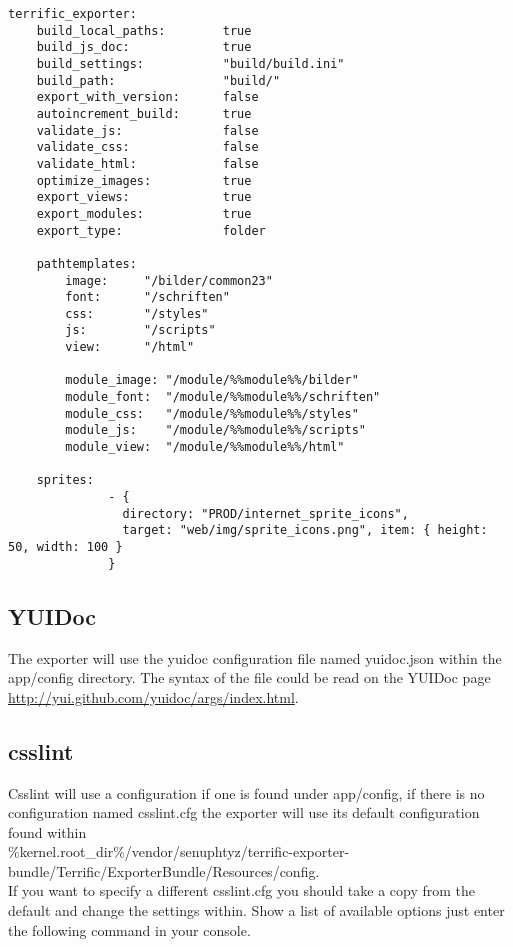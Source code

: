 \begin{verbatim}
terrific_exporter:
	build_local_paths:        true
	build_js_doc:             true
	build_settings:           "build/build.ini"
	build_path:               "build/"
	export_with_version:      false
	autoincrement_build:      true
	validate_js:              false
	validate_css:             false
	validate_html:            false
	optimize_images:          true
	export_views:             true
	export_modules:           true
	export_type:              folder

	pathtemplates:
        image:     "/bilder/common23"
        font:      "/schriften"
        css:       "/styles"
        js:        "/scripts"
        view:      "/html"

        module_image: "/module/%%module%%/bilder"
        module_font:  "/module/%%module%%/schriften"
        module_css:   "/module/%%module%%/styles"
        module_js:    "/module/%%module%%/scripts"
        module_view:  "/module/%%module%%/html"

	sprites:
              - {
                directory: "PROD/internet_sprite_icons",
                target: "web/img/sprite_icons.png", item: { height: 50, width: 100 }
              }

\end{verbatim}

\subsection{YUIDoc}
The exporter will use the yuidoc configuration file named yuidoc.json within the app/config directory. The syntax of the file could be read on the YUIDoc page \url{http://yui.github.com/yuidoc/args/index.html}.

\subsection{csslint}
Csslint will use a configuration if one is found under app/config, if there is no configuration named csslint.cfg the exporter will use its default configuration found within\\
\%kernel.root\_dir\%/vendor/senuphtyz/terrific-exporter-bundle/Terrific/ExporterBundle/Resources/config. \\

If you want to specify a different csslint.cfg you should take a copy from the default and change the settings within. Show a list of available options just enter the following command in your console.

